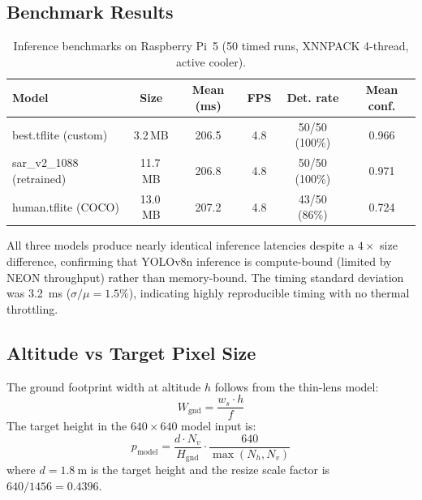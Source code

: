 \documentclass[10pt,a4paper]{article}
\begin{document}
\subsection{Benchmark Results}

\begin{table}[ht]
  \centering
  \caption{Inference benchmarks on Raspberry Pi~5 (50 timed runs, XNNPACK 4-thread, active cooler).}\label{tab:benchmarks}
  \begin{tabular}{@{}l c c c c c@{}}
    \toprule
    \textbf{Model} & \textbf{Size} & \textbf{Mean (ms)} & \textbf{FPS} & \textbf{Det. rate} & \textbf{Mean conf.} \\
    \midrule
    best.tflite (custom)     & 3.2\,MB  & 206.5 & 4.8 & 50/50 (100\%) & 0.966 \\
    sar\_v2\_1088 (retrained) & 11.7\,MB & 206.8 & 4.8 & 50/50 (100\%) & 0.971 \\
    human.tflite (COCO)      & 13.0\,MB & 207.2 & 4.8 & 43/50 (86\%) & 0.724 \\
    \bottomrule
  \end{tabular}
\end{table}

All three models produce nearly identical inference latencies despite a $4\times$ size difference, confirming that YOLOv8n inference is compute-bound (limited by NEON throughput) rather than memory-bound. The timing standard deviation was \SI{3.2}{\milli\second} ($\sigma/\mu = 1.5\%$), indicating highly reproducible timing with no thermal throttling.

\subsection{Altitude vs Target Pixel Size}

The ground footprint width at altitude $h$ follows from the thin-lens model:
\begin{equation}\label{eq:footprint}
  W_{\mathrm{gnd}} = \frac{w_s \cdot h}{f}
\end{equation}
The target height in the $640 \times 640$ model input is:
\begin{equation}\label{eq:dummypx}
  p_{\mathrm{model}} = \frac{d \cdot N_v}{H_{\mathrm{gnd}}} \cdot \frac{640}{\max(N_h, N_v)}
\end{equation}
where $d = \SI{1.8}{\metre}$ is the target height and the resize scale factor is $640/1456 = 0.4396$.
\end{document}

